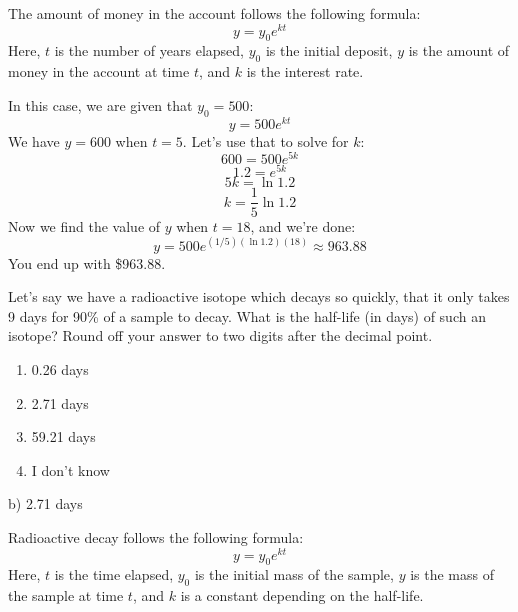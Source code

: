 \documentclass[addpoints,12pt,answers]{exam}
\begin{document}
\begin{questions}
\begin{solution}
    The amount of money in the account follows the following formula:
    $$y=y_0e^{kt}$$
    Here, $t$ is the number of years elapsed, $y_0$ is the initial deposit, $y$ is the amount of money in the account at time $t$, and $k$ is the interest rate.
    
    In this case, we are given that $y_0=500$:
    $$y=500e^{kt}$$
    We have $y=600$ when $t=5$. Let's use that to solve for $k$:
    $$600=500e^{5k}$$
    $$1.2=e^{5k}$$
    $$5k=\ln 1.2$$
    $$k=\frac{1}{5}\ln 1.2$$
    Now we find the value of $y$ when $t=18$, and we're done:
    $$y=500e^{(1/5)(\ln 1.2)(18)}\approx 963.88$$
    You end up with \$963.88.
  \end{solution}
  \newpage
  \question
  Let's say we have a radioactive isotope which decays so quickly, that it only takes 9 days for 90\% of a sample to decay. What is the half-life (in days) of such an isotope? Round off your answer to two digits after the decimal point.
  \begin{enumerate}[label=\alph*)]
    \item
    0.26 days
    \item
    2.71 days
    \item
    59.21 days
    \item
    I don't know
  \end{enumerate}
  \begin{solution}
    b) 2.71 days
    
    Radioactive decay follows the following formula:
    $$y=y_0e^{kt}$$
    Here, $t$ is the time elapsed, $y_0$ is the initial mass of the sample, $y$ is the mass of the sample at time $t$, and $k$ is a constant depending on the half-life.
    

\end{solution}
\end{questions}
\end{document}
